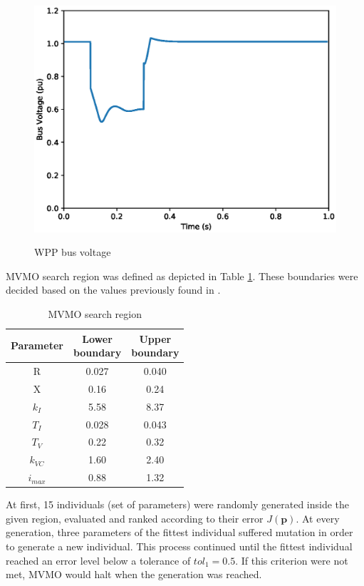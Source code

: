 \begin{figure}[!h]
	\centering
	\caption{WPP bus voltage}
	\includegraphics[scale=.7]{Images/bus_voltage.eps}
	\label{fig: WPP_voltage}
\end{figure}

MVMO search region was defined as depicted in Table \ref{tab: MVMO_boundaries}. These boundaries were decided based on the values previously found in \cite{Cari2015}.

\begin{table}[!h]
	\centering
	\caption{MVMO search region}
	\begin{tabular}{c|cc}
		Parameter & \shortstack{Lower \\ boundary} & \shortstack{Upper \\ boundary} \\\hline
		R & 0.027 & 0.040 \\
		X & 0.16 & 0.24 \\
		$k_{I}$ & 5.58 & 8.37 \\
		$T_{I}$ & 0.028 & 0.043 \\
		$T_{V}$ & 0.22 & 0.32 \\
		$k_{VC}$ & 1.60 & 2.40 \\
		$i_{max}$ & 0.88 & 1.32
	\end{tabular}
	\label{tab: MVMO_boundaries}
\end{table}

At first, 15 individuals (set of parameters) were randomly generated inside the given region, evaluated and ranked according to their error $J(\mathbf{p})$. At every generation, three parameters of the fittest individual suffered mutation in order to generate a new individual. This process continued until the fittest individual reached an error level below a tolerance of $tol_{1} = 0.5$. If this criterion were not met, MVMO would halt when the  generation was reached.

